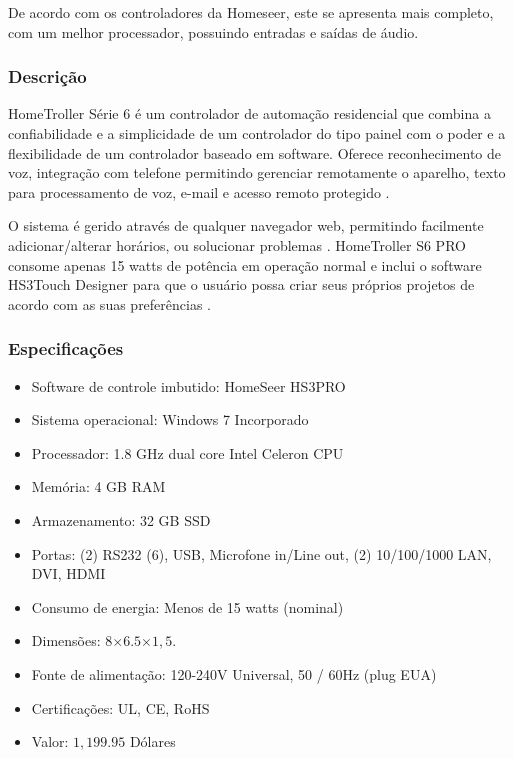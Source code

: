 	De acordo com os controladores da Homeseer, este se apresenta mais completo, com um melhor processador, possuindo entradas e saídas de áudio. 

\subsubsection{Descrição}

	HomeTroller Série 6 é um controlador de automação residencial que combina a confiabilidade e a simplicidade de um controlador do tipo painel com o poder e a flexibilidade de um controlador baseado em software. Oferece reconhecimento de voz, integração com telefone permitindo gerenciar remotamente o aparelho, texto para processamento de voz, e-mail e acesso remoto protegido \cite{HomeSeerHomeTroller}.

	O sistema é gerido através de qualquer navegador web, permitindo facilmente adicionar/alterar horários, ou solucionar problemas \cite{2009AutomacaoMarilia}. HomeTroller S6 PRO consome apenas 15 watts de potência em operação normal e inclui o software HS3Touch Designer para que o usuário possa criar seus próprios projetos de acordo com as suas preferências \cite{HomeSeerHomeTroller}.

\subsubsection{Especificações}
\begin{itemize}
\item Software de controle imbutido: HomeSeer HS3PRO
\item Sistema operacional: Windows 7 Incorporado
\item Processador: 1.8 GHz dual core Intel Celeron CPU
\item Memória: 4 GB RAM
\item Armazenamento: 32 GB SSD
\item Portas: (2) RS232 (6), USB, Microfone in/Line out, (2) 10/100/1000 LAN, DVI, HDMI
\item Consumo de energia: Menos de 15 watts (nominal)
\item Dimensões: $8$\textquotedbl$\times6.5$\textquotedbl$\times1,5$\textquotedbl.
\item Fonte de alimentação: 120-240V Universal, 50 / 60Hz (plug EUA)
\item Certificações: UL, CE, RoHS
\item Valor: $1,199.95$ Dólares 
\end{itemize}

